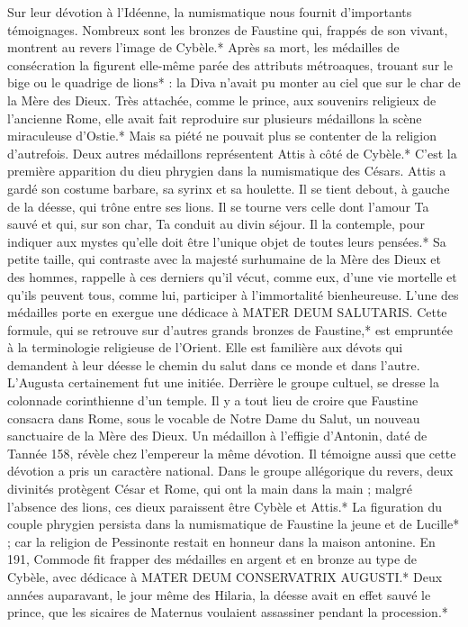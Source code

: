 \documentclass[a4paper, 11pt, oneside, polutonikogreek, french]{article}
\begin{document}
Sur leur dévotion à l'Idéenne, la numismatique nous fournit d'importants témoignages. Nombreux sont les bronzes de Faustine qui, frappés de son vivant, montrent au revers l'image de Cybèle.* Après sa mort, les médailles de consécration la figurent elle-même parée des attributs métroaques, trouant sur le bige ou le quadrige de lions* : la Diva n'avait pu monter au ciel que sur le char de la Mère des Dieux. Très attachée, comme le prince, aux souvenirs religieux de l'ancienne Rome, elle avait fait reproduire sur plusieurs médaillons la scène miraculeuse d'Ostie.* Mais sa piété ne pouvait plus se contenter de la religion d'autrefois. Deux autres médaillons représentent Attis à côté de Cybèle.* C'est la première apparition du dieu phrygien dans la numismatique des Césars. Attis a gardé son costume barbare, sa syrinx et sa houlette. Il se tient debout, à gauche de la déesse, qui trône entre ses lions. Il se tourne vers celle dont l'amour Ta sauvé et qui, sur son char, Ta conduit au divin séjour. Il la contemple, pour indiquer aux mystes qu'elle doit être l'unique objet de toutes leurs pensées.* Sa petite taille, qui contraste avec la majesté surhumaine de la Mère des Dieux et des hommes, rappelle à ces derniers qu'il vécut, comme eux, d'une vie mortelle et qu'ils peuvent tous, comme lui, participer à l'immortalité bienheureuse. L'une des médailles porte en exergue une dédicace à MATER DEUM SALUTARIS. Cette formule, qui se retrouve sur d'autres grands bronzes de Faustine,* est empruntée à la terminologie religieuse de l'Orient. Elle est familière aux dévots qui demandent à leur déesse le chemin du salut dans ce monde et dans l'autre. L'Augusta certainement fut une initiée. Derrière le groupe cultuel, se dresse la colonnade corinthienne d'un temple. Il y a tout lieu de croire que Faustine consacra dans Rome, sous le vocable de Notre Dame du Salut, un nouveau sanctuaire de la Mère des Dieux. Un médaillon à l'effigie d'Antonin, daté de Tannée 158, révèle chez l'empereur la même dévotion. Il témoigne aussi que cette dévotion a pris un caractère national. Dans le groupe allégorique du revers, deux divinités protègent César et Rome, qui ont la main dans la main ; malgré l'absence des lions, ces dieux paraissent être Cybèle et Attis.* La figuration du couple phrygien persista dans la numismatique de Faustine la jeune et de Lucille* ; car la religion de Pessinonte restait en honneur dans la maison antonine. En 191, Commode fit frapper des médailles en argent et en bronze au type de Cybèle, avec dédicace à MATER DEUM CONSERVATRIX AUGUSTI.* Deux années auparavant, le jour même des Hilaria, la déesse avait en effet sauvé le prince, que les sicaires de Maternus voulaient assassiner pendant la procession.*
\end{document}
